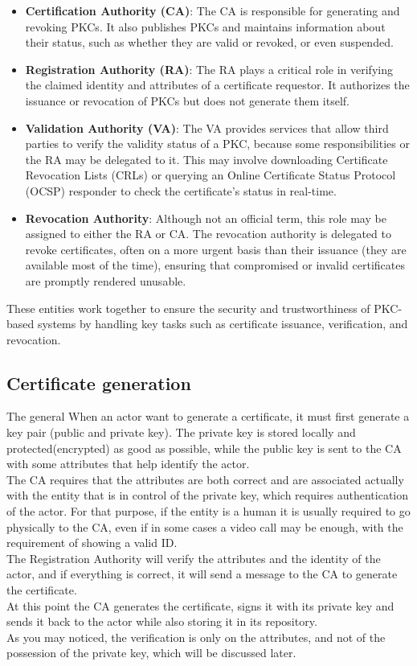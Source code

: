 \begin{itemize}
  \item \textbf{Certification Authority (CA)}: The CA is responsible
    for generating and revoking PKCs. It also publishes PKCs and
    maintains information about their status, such as whether they
    are valid or revoked, or even suspended.
  \item \textbf{Registration Authority (RA)}: The RA plays a
    critical role in verifying the claimed identity and attributes
    of a certificate requestor. It authorizes the issuance or
    revocation of PKCs but does not generate them itself.
  \item \textbf{Validation Authority (VA)}: The VA provides services
    that allow third parties to verify the validity status of a PKC,
    because some responsibilities or the RA may be delegated to it.
    This may involve downloading Certificate Revocation Lists (CRLs)
    or querying an Online Certificate Status Protocol (OCSP)
    responder to check the certificate's status in real-time.
  \item \textbf{Revocation Authority}: Although not an official
    term, this role may be assigned to either the RA or CA. The
    revocation authority is delegated to revoke certificates, often
    on a more urgent basis than their issuance (they are available
    most of the time), ensuring that compromised or invalid
    certificates are promptly rendered unusable.
\end{itemize}

These entities work together to ensure the security and
trustworthiness of PKC-based systems by handling key tasks such as
certificate issuance, verification, and revocation.

\subsection{Certificate generation}
The general
When an actor want to generate a certificate, it must first generate a 
key pair (public and private key). The private key is stored locally
and protected(encrypted) as good as possible, while the public key 
is sent to the CA with some attributes that help identify the actor.\\
The CA requires that the attributes are both correct and are
associated actually with the entity that is in control of the private
key, which requires authentication of the actor. For that purpose, if
the entity is a human it is usually required to go physically to the 
CA, even if in some cases a video call may be enough, with the 
requirement of showing a valid ID.\\
The Registration Authority will verify the attributes and the 
identity of the actor, and if everything is correct, it will send a 
message to the CA to generate the certificate.\\
At this point the CA generates the certificate, signs it with its 
private key and sends it back to the actor while also storing it in 
its repository.\\
As you may noticed, the verification is only on the attributes, and
not of the possession of the private key, which will be discussed
later.


